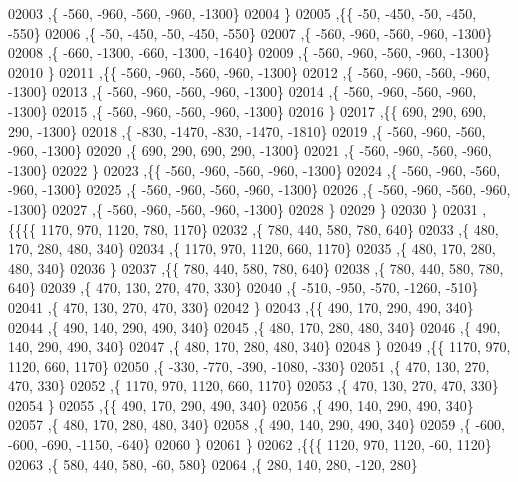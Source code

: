 \begin{DoxyCode}
02003     ,\{  -560,  -960,  -560,  -960, -1300\}
02004     \}
02005    ,\{\{   -50,  -450,   -50,  -450,  -550\}
02006     ,\{   -50,  -450,   -50,  -450,  -550\}
02007     ,\{  -560,  -960,  -560,  -960, -1300\}
02008     ,\{  -660, -1300,  -660, -1300, -1640\}
02009     ,\{  -560,  -960,  -560,  -960, -1300\}
02010     \}
02011    ,\{\{  -560,  -960,  -560,  -960, -1300\}
02012     ,\{  -560,  -960,  -560,  -960, -1300\}
02013     ,\{  -560,  -960,  -560,  -960, -1300\}
02014     ,\{  -560,  -960,  -560,  -960, -1300\}
02015     ,\{  -560,  -960,  -560,  -960, -1300\}
02016     \}
02017    ,\{\{   690,   290,   690,   290, -1300\}
02018     ,\{  -830, -1470,  -830, -1470, -1810\}
02019     ,\{  -560,  -960,  -560,  -960, -1300\}
02020     ,\{   690,   290,   690,   290, -1300\}
02021     ,\{  -560,  -960,  -560,  -960, -1300\}
02022     \}
02023    ,\{\{  -560,  -960,  -560,  -960, -1300\}
02024     ,\{  -560,  -960,  -560,  -960, -1300\}
02025     ,\{  -560,  -960,  -560,  -960, -1300\}
02026     ,\{  -560,  -960,  -560,  -960, -1300\}
02027     ,\{  -560,  -960,  -560,  -960, -1300\}
02028     \}
02029    \}
02030   \}
02031  ,\{\{\{\{  1170,   970,  1120,   780,  1170\}
02032     ,\{   780,   440,   580,   780,   640\}
02033     ,\{   480,   170,   280,   480,   340\}
02034     ,\{  1170,   970,  1120,   660,  1170\}
02035     ,\{   480,   170,   280,   480,   340\}
02036     \}
02037    ,\{\{   780,   440,   580,   780,   640\}
02038     ,\{   780,   440,   580,   780,   640\}
02039     ,\{   470,   130,   270,   470,   330\}
02040     ,\{  -510,  -950,  -570, -1260,  -510\}
02041     ,\{   470,   130,   270,   470,   330\}
02042     \}
02043    ,\{\{   490,   170,   290,   490,   340\}
02044     ,\{   490,   140,   290,   490,   340\}
02045     ,\{   480,   170,   280,   480,   340\}
02046     ,\{   490,   140,   290,   490,   340\}
02047     ,\{   480,   170,   280,   480,   340\}
02048     \}
02049    ,\{\{  1170,   970,  1120,   660,  1170\}
02050     ,\{  -330,  -770,  -390, -1080,  -330\}
02051     ,\{   470,   130,   270,   470,   330\}
02052     ,\{  1170,   970,  1120,   660,  1170\}
02053     ,\{   470,   130,   270,   470,   330\}
02054     \}
02055    ,\{\{   490,   170,   290,   490,   340\}
02056     ,\{   490,   140,   290,   490,   340\}
02057     ,\{   480,   170,   280,   480,   340\}
02058     ,\{   490,   140,   290,   490,   340\}
02059     ,\{  -600,  -600,  -690, -1150,  -640\}
02060     \}
02061    \}
02062   ,\{\{\{  1120,   970,  1120,   -60,  1120\}
02063     ,\{   580,   440,   580,   -60,   580\}
02064     ,\{   280,   140,   280,  -120,   280\}

\end{DoxyCode}
